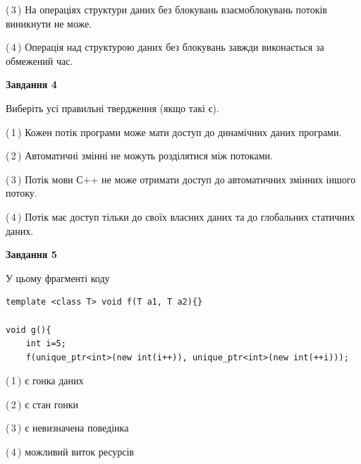 \documentclass[12pt, ukrainian]{article}
\begin{document}
\begin {large}
{(\,3\,) На операціях структури даних без блокувань взаємоблокувань потоків виникнути не може.%

(\,4\,) Операція над структурою даних без блокувань завжди виконається за обмежений час.%



\begin{center}
\textbf{Завдання 4}
\end{center}
Виберіть усі правильні твердження (якщо такі є).\par
\vspace{2mm}

(\,1\,) Кожен потік програми може мати доступ до динамічних даних програми.%

(\,2\,) Автоматичні змінні не можуть розділятися між потоками.%

(\,3\,) Потік мови С++ не може отримати доступ до автоматичних змінних іншого потоку.%

(\,4\,) Потік має доступ тільки до своїх власних даних та до глобальних статичних даних.%



\begin{center}
\textbf{Завдання 5}
\end{center}
У цьому фрагменті коду
\begin{verbatim}
template <class T> void f(T a1, T a2){}

void g(){
    int i=5;
    f(unique_ptr<int>(new int(i++)), unique_ptr<int>(new int(++i)));
\end{verbatim}

(\,1\,) є гонка даних%

(\,2\,) є стан гонки%

(\,3\,) є невизначена поведінка%

(\,4\,) можливий виток ресурсів%


}
\end {large}
\end{document}
